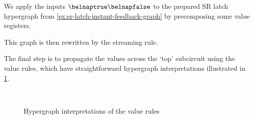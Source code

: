 \begin{example}\label{ex:sr-latch-streaming-graph}
    We apply the inputs \(\belnaptrue\belnapfalse\) to the prepared SR latch
    hypergraph from \cref{ex:sr-latch-instant-feedback-graph} by precomposing
    some value registers.
    \vspace{-1em}
    \begin{center}
    \end{center}
    This graph is then rewritten by the streaming rule.
    \vspace{-2em}
    \begin{center}
    \end{center}
\end{example}

The final step is to propagate the values across the `top' subcircuit using the
value rules, which have straightforward hypergraph interpretations illustrated
in \cref{fig:graph-values}.

\begin{figure}
    \centering
    \scalebox{0.8}{}
    \quad
    \raisebox{0.5em}{\scalebox{0.8}{}}
    \\
    \scalebox{0.8}{}
    \quad
    \raisebox{1em}{\scalebox{0.8}{}}
    \caption{Hypergraph interpretations of the value rules}
    \label{fig:graph-values}
\end{figure}

